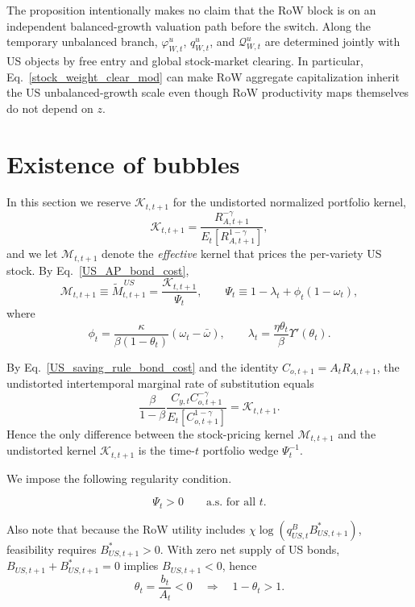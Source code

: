 \documentclass{article}
\begin{document}
The proposition intentionally makes no claim that the RoW block is on an independent balanced-growth valuation path before the switch. Along the temporary unbalanced branch, $\varphi_{W,t}^u$, $q_{W,t}^u$, and $\mathcal Q_{W,t}^u$ are determined jointly with US objects by free entry and global stock-market clearing. In particular, Eq.~\eqref{stock_weight_clear_mod} can make RoW aggregate capitalization inherit the US unbalanced-growth scale even though RoW productivity maps themselves do not depend on $z$.

\section{Existence of bubbles}\label{sec:existence_of_bubbles}

In this section we reserve $\mathcal K_{t,t+1}$ for the undistorted normalized portfolio kernel,
\[
\mathcal K_{t,t+1}
=
\frac{R_{A,t+1}^{-\gamma}}{E_t\!\left[R_{A,t+1}^{1-\gamma}\right]},
\]
and we let $\mathcal M_{t,t+1}$ denote the \emph{effective} kernel that prices the per-variety US stock. By Eq.~\eqref{US_AP_bond_cost},
\begin{equation}\label{effective_US_kernel}
\mathcal M_{t,t+1}
\equiv
\widetilde M^{\,US}_{t,t+1}
=
\frac{\mathcal K_{t,t+1}}{\Psi_t},
\qquad
\Psi_t
\equiv
1-\lambda_t+\phi_t(1-\omega_t),
\end{equation}
where
\[
\phi_t=\frac{\kappa}{\beta(1-\theta_t)}(\omega_t-\bar\omega),
\qquad
\lambda_t=\frac{\eta\theta_t}{\beta}\Upsilon'(\theta_t).
\]

By Eq.~\eqref{US_saving_rule_bond_cost} and the identity $C_{o,t+1}=A_tR_{A,t+1}$, the undistorted intertemporal marginal rate of substitution equals
\[
\frac{\beta}{1-\beta}
\frac{C_{y,t}C_{o,t+1}^{-\gamma}}{E_t\!\left[C_{o,t+1}^{1-\gamma}\right]}
=
\mathcal K_{t,t+1}.
\]
Hence the only difference between the stock-pricing kernel $\mathcal M_{t,t+1}$ and the undistorted kernel $\mathcal K_{t,t+1}$ is the time-$t$ portfolio wedge $\Psi_t^{-1}$.

We impose the following regularity condition.

\begin{ass}\label{ass_regular_kernel}
\[
\Psi_t>0
\qquad\text{a.s. for all }t.
\]
\end{ass}

Also note that because the RoW utility includes $\chi\log(q^B_{US,t}B^*_{US,t+1})$, feasibility requires $B^*_{US,t+1}>0$. With zero net supply of US bonds, $B_{US,t+1}+B^*_{US,t+1}=0$ implies $B_{US,t+1}<0$, hence
\begin{equation}\label{theta_nonpos}
\theta_t=\frac{b_t}{A_t}<0
\quad\Rightarrow\quad
1-\theta_t>1.
\end{equation}
\end{document}

